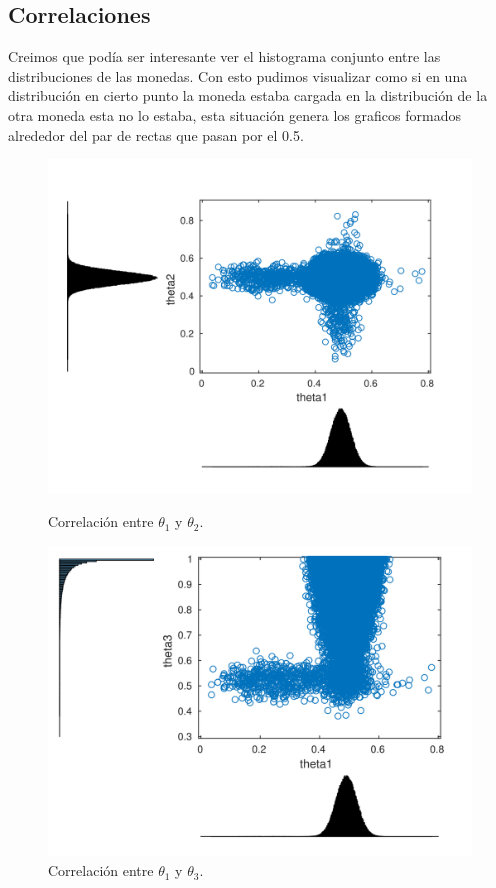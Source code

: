 \subsection{Correlaciones}

Creimos que podía ser interesante ver el histograma conjunto entre las distribuciones de las monedas. Con esto pudimos visualizar como si en una distribución en cierto punto la moneda estaba cargada en la distribución de la otra moneda esta no lo estaba, esta situación genera los graficos formados alrededor del par de rectas que pasan por el 0.5.

\begin{figure}[H]
\begin{minipage}{0.5\textwidth}
 \centering
	\includegraphics[width=1.0\textwidth]{imgs/theta1_2.png}
	\caption{\footnotesize Correlación entre $\theta_1$ y $\theta_2$.}
	\label{fig:problema2-promedio}
\end{minipage}
\begin{minipage}{0.5\textwidth}
 \centering
	\includegraphics[width=1.0\textwidth]{imgs/theta1_3.png}
	\caption{\footnotesize Correlación entre $\theta_1$ y $\theta_3$.}
\end{minipage}
\end{figure}

